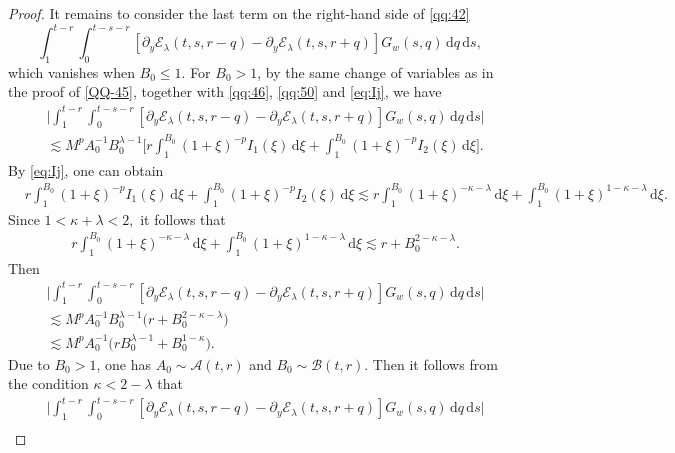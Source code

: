 \documentclass[10pt,a4paper]{amsart}
\newcommand{\Acal}{\mathcal A}
\newcommand{\Bcal}{\mathcal B}
\newcommand{\Ecal}{\mathcal E}
\newcommand{\dd}{\,\mathrm{d}}
\begin{document}
\begin{proof}
It remains to consider the last term on the right-hand side of
\eqref{qq:42}
\[
\int_1^{t-r}
\int_0^{t-s-r}
\left[
\partial_y\Ecal_\lambda(t,s,r-q)
-
\partial_y\Ecal_\lambda(t,s,r+q)
\right]
G_w(s,q)\dd q\dd s,
\]
which vanishes when $B_0\leq1$. For $B_0>1$, by the same
change of variables as in the proof of \eqref{QQ-45}, together
with \eqref{qq:46}, \eqref{qq:50} and \eqref{eq:Ij}, we have
\begin{equation}
\label{qq:64'}
\begin{aligned}
&
\big|
\int_1^{t-r}
\int_0^{t-s-r}
\left[
\partial_y\Ecal_\lambda(t,s,r-q)
-
\partial_y\Ecal_\lambda(t,s,r+q)
\right]
G_w(s,q)\dd q\dd s
\big|\\
&\lesssim
M^p
A_0^{-1}B_0^{\lambda-1}
\big[
r
\int_1^{B_0}
(1+\xi)^{-p}
I_1(\xi)\dd\xi
+
\int_1^{B_0}
(1+\xi)^{-p}
I_2(\xi)\dd\xi
\big].
\end{aligned}
\end{equation}
By \eqref{eq:Ij}, one can obtain
\[
\begin{aligned}
&
r
\int_1^{B_0}
(1+\xi)^{-p}
I_1(\xi)\dd\xi
+
\int_1^{B_0}
(1+\xi)^{-p}
I_2(\xi)\dd\xi\lesssim
r
\int_1^{B_0}
(1+\xi)^{-\kappa-\lambda}
\dd\xi
+
\int_1^{B_0}
(1+\xi)^{1-\kappa-\lambda}
\dd\xi .
\end{aligned}
\]
Since
$
1<\kappa+\lambda<2,
$
it follows that
\[
\begin{aligned}
&
r
\int_1^{B_0}
(1+\xi)^{-\kappa-\lambda}
\dd\xi
+
\int_1^{B_0}
(1+\xi)^{1-\kappa-\lambda}
\dd\xi\lesssim
r+B_0^{2-\kappa-\lambda}.
\end{aligned}
\]
Then
\begin{equation}
\label{qq:65}
\begin{aligned}
&
\big|
\int_1^{t-r}
\int_0^{t-s-r}
\left[
\partial_y\Ecal_\lambda(t,s,r-q)
-
\partial_y\Ecal_\lambda(t,s,r+q)
\right]
G_w(s,q)\dd q\dd s
\big|\\
&\lesssim
M^pA_0^{-1}B_0^{\lambda-1}
\big(
r+B_0^{2-\kappa-\lambda}
\big)\\
&\lesssim
M^pA_0^{-1}
\big(
rB_0^{\lambda-1}
+B_0^{1-\kappa}
\big).
\end{aligned}
\end{equation}
Due to $B_0>1$, one has
$A_0\sim\Acal(t,r)$ and $B_0\sim\Bcal(t,r)$.
Then it follows from the condition $\kappa<2-\lambda$  that
\begin{equation}
\label{qq:66}
\begin{aligned}
&
\big|
\int_1^{t-r}
\int_0^{t-s-r}
\left[
\partial_y\Ecal_\lambda(t,s,r-q)
-\partial_y\Ecal_\lambda(t,s,r+q)
\right]
G_w(s,q)\dd q\dd s
\big|\\

\end{aligned}
\end{equation}
\end{proof}
\end{document}
